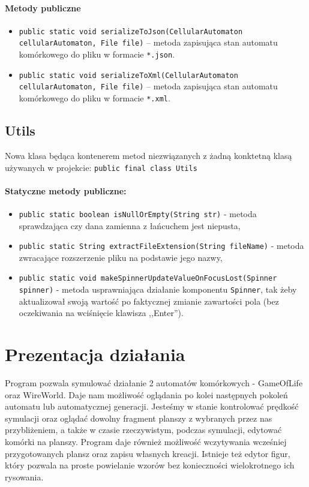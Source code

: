 \documentclass{mwart}
\begin{document}
\paragraph{Metody publiczne}
\begin{itemize}
	\item \texttt{public static void serializeToJson(CellularAutomaton cellularAutomaton, File file)} -- metoda zapisująca stan automatu komórkowego do pliku w formacie \texttt{*.json}.
	\item \texttt{public static void serializeToXml(CellularAutomaton cellularAutomaton, File file)} -- metoda zapisująca stan automatu komórkowego do pliku w formacie \texttt{*.xml}.
\end{itemize}

\subsection{Utils}
Nowa klasa będąca kontenerem metod niezwiązanych z żadną konktetną klasą używanych w projekcie:
\texttt{public final class Utils}

\paragraph{Statyczne metody publiczne:}
\begin{itemize}
	\item \texttt{public static boolean isNullOrEmpty(String str)} - metoda sprawdzająca czy dana zamienna z łańcuchem jest niepusta,
	\item \texttt{public static String extractFileExtension(String fileName)} - metoda zwracające rozszerzenie pliku na podstawie jego nazwy,
	\item \texttt{public static void makeSpinnerUpdateValueOnFocusLost(Spinner spinner)} - metoda usprawniająca działanie komponentu \texttt{Spinner}, tak żeby aktualizował swoją wartość po faktycznej zmianie zawartości pola (bez oczekiwania na wciśnięcie klawisza ,,Enter'').
\end{itemize}

\section{Prezentacja działania}
Program pozwala symulować działanie 2 automatów komórkowych - GameOfLife oraz WireWorld. Daje nam możliwość oglądania po kolei następnych pokoleń automatu lub automatycznej generacji. Jesteśmy w stanie kontrolować prędkość symulacji oraz oglądać dowolny fragment planszy z wybranych przez nas przybliżeniem, a także w czasie rzeczywistym, podczas symulacji, edytować komórki na planszy. Program daje również możliwość wczytywania wcześniej przygotowanych plansz oraz zapisu własnych kreacji. Istnieje też edytor figur, który pozwala na proste powielanie wzorów bez konieczności wielokrotnego ich rysowania.
\end{document}
